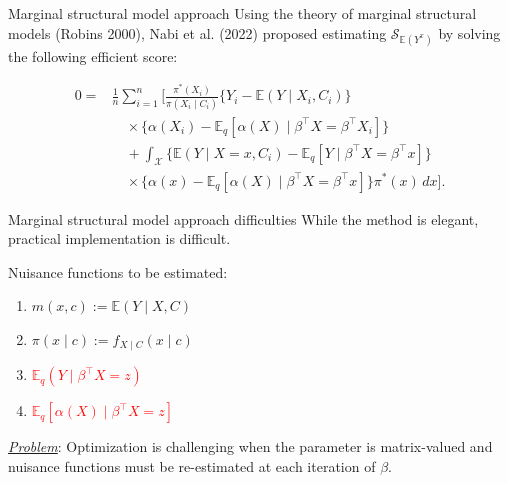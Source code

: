 \documentclass[
  ignorenonframetext,
  aspectratio=169,
  11pt]{beamer}
\providecommand{\tightlist}{%
  \setlength{\itemsep}{0pt}\setlength{\parskip}{0pt}}
\begin{document}
\begin{frame}{Marginal structural model approach}
\protect{}\label{marginal-structural-model-approach}
Using the theory of marginal structural models {\color{emoryblue}(Robins
2000)}, {\color{emoryblue}Nabi et al. (2022)} proposed estimating
\(\mathcal{S}_{\mathbb{E}(Y^x)}\) by solving the following efficient
score:

\[
\begin{aligned}
0={}&\frac{1}{n}\sum_{i=1}^n
\Bigg[
\frac{\pi^*(X_i)}{\pi(X_i\mid C_i)}
\Big\{Y_i-\mathbb E(Y\mid X_i,C_i)\Big\}
\\
&\quad\times
\Big\{\alpha(X_i)
-\mathbb E_q[\alpha(X)\mid\beta^\top X=\beta^\top X_i]\Big\}
\\[6pt]
&\quad+
\int_{\mathcal X}
\Big\{\mathbb E(Y\mid X=x,C_i)
-\mathbb E_q[Y\mid\beta^\top X=\beta^\top x]\Big\}
\\
&\quad\times
\Big\{\alpha(x)
-\mathbb E_q[\alpha(X)\mid\beta^\top X=\beta^\top x]\Big\}
\pi^*(x)\,dx
\Bigg].
\end{aligned}
\]
\end{frame}

\begin{frame}{Marginal structural model approach difficulties}
\protect{}\label{marginal-structural-model-approach-difficulties}
While the method is elegant, practical implementation is difficult.

\pause

Nuisance functions to be estimated:

\begin{enumerate}
\tightlist
\item
  \(m(x,c):= \mathbb{E}(Y\mid X, C)\)
\item
  \(\pi(x\mid c):= f_{X\mid C}(x\mid c)\)
\item
  \textcolor<3->{red}{$\mathbb{E}_q(Y\mid\beta^\top X=z)$}
\item
  \textcolor<3->{red}{$\mathbb{E}_q[\alpha(X)\mid\beta^\top X=z]$}
\end{enumerate}

\pause

\underline{\textit{Problem}}: Optimization is challenging when the
parameter is matrix-valued and nuisance functions must be re-estimated
at each iteration of \(\beta\).
\end{frame}
\end{document}
